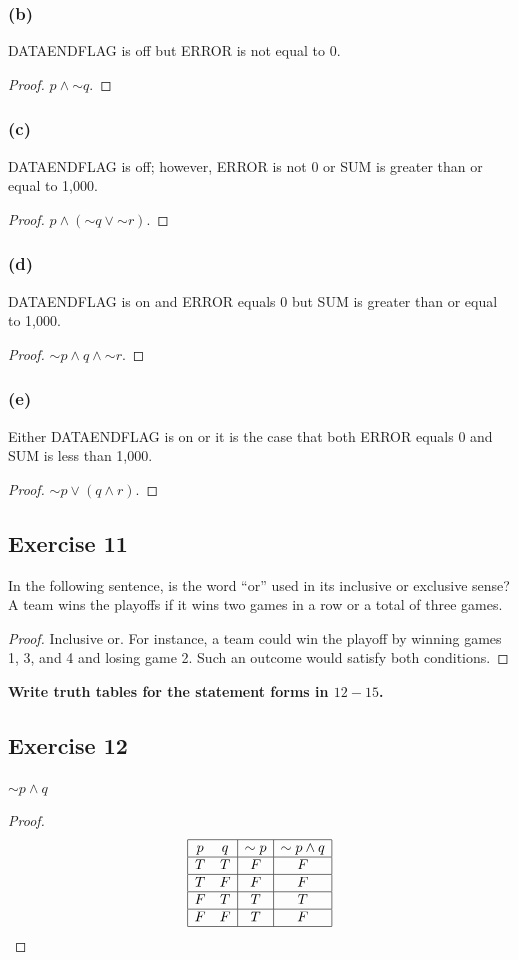 \documentclass[14pt]{extarticle}
\begin{document}
\subsubsection{(b)} DATAENDFLAG is off but ERROR is not equal to 0.
\begin{proof} $p \wedge {\sim q}$. \end{proof}
\subsubsection{(c)} DATAENDFLAG is off; however, ERROR is not 0 or SUM is
greater than or equal to 1,000.

\begin{proof} $p \wedge ({\sim q} \vee {\sim r})$. \end{proof}
\subsubsection{(d)} DATAENDFLAG is on and ERROR equals 0 but SUM is greater than
or equal to 1,000.

\begin{proof} ${\sim p} \wedge q \wedge {\sim r}$. \end{proof}
\subsubsection{(e)} Either DATAENDFLAG is on or it is the case that both ERROR
equals 0 and SUM is less than 1,000.

\begin{proof} ${\sim p} \vee (q \wedge r)$. \end{proof}
\subsection{Exercise 11} In the following sentence, is the word ``or'' used in
its inclusive or exclusive sense? A team wins the playoffs if it wins two games
in a row or a total of three games.

\begin{proof} Inclusive or. For instance, a team could win the playoff by
winning games 1, 3, and 4 and losing game 2. Such an outcome would satisfy both
conditions. \end{proof}

{\bf Write truth tables for the statement forms in $12-15$.}

\subsection{Exercise 12} ${\sim p} \wedge q$
\begin{proof} $$ \begin{array}{|cc|c|c|} \hline p & q & {\sim p} & {\sim p}
\wedge q \\ \hline T & T & F & F \\ \hline T & F & F & F \\ \hline F & T & T & T
\\ \hline F & F & T & F \\ \hline \end{array} $$ \end{proof}
\end{document}
